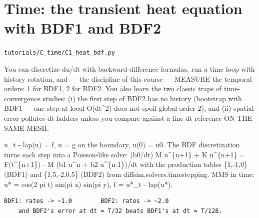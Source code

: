 \chapter{Time: the transient heat equation with BDF1 and BDF2}
\label{ch:C1_heat_bdf}
\noindent\texttt{tutorials/C\_time/C1\_heat\_bdf.py}\\[0.75em]
\begin{outcome}
You can discretize du/dt with backward-difference
formulas, run a time loop with history rotation, and — the discipline of
this course — MEASURE the temporal orders: 1 for BDF1, 2 for BDF2. You
also learn the two classic traps of time-convergence studies: (i) the
first step of BDF2 has no history (bootstrap with BDF1 — one step at
local O(dt\textasciicircum{}2) does not spoil global order 2), and (ii) spatial error
pollutes dt-ladders unless you compare against a fine-dt reference ON THE
SAME MESH.
\end{outcome}

u\_t - lap(u) = f,  u = g on the boundary, u(0) = u0. The BDF
discretization turns each step into a Poisson-like solve:
    (b0/dt) M u\textasciicircum{}\{n+1\} + K u\textasciicircum{}\{n+1\} = F(t\textasciicircum{}\{n+1\}) - M (b1 u\textasciicircum{}n + b2 u\textasciicircum{}\{n-1\})/dt
with the production tables \{1,-1,0\} (BDF1) and \{1.5,-2,0.5\} (BDF2) from
diffsim.solvers.timestepping. MMS in time: u* = cos(2 pi t) sin(pi x)
sin(pi y), f = u*\_t - lap(u*).

\begin{expected}
\begin{verbatim}
BDF1: rates -> ~1.0        BDF2: rates -> ~2.0
    and BDF2's error at dt = T/32 beats BDF1's at dt = T/128.
\end{verbatim}
\end{expected}

